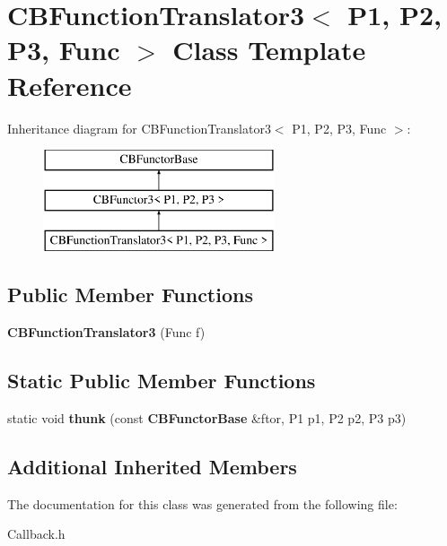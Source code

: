 \section{C\+B\+Function\+Translator3$<$ P1, P2, P3, Func $>$ Class Template Reference}
\label{classCBFunctionTranslator3}
Inheritance diagram for C\+B\+Function\+Translator3$<$ P1, P2, P3, Func $>$\+:\begin{figure}[H]
\begin{center}
\leavevmode
\includegraphics[height=3.000000cm]{classCBFunctionTranslator3}
\end{center}
\end{figure}
\subsection*{Public Member Functions}
\begin{DoxyCompactItemize}
\item 
{\bfseries C\+B\+Function\+Translator3} (Func f)\label{classCBFunctionTranslator3_a59d1209449916b44b8ff86c0101c2df8}

\end{DoxyCompactItemize}
\subsection*{Static Public Member Functions}
\begin{DoxyCompactItemize}
\item 
static void {\bfseries thunk} (const {\bf C\+B\+Functor\+Base} \&ftor, P1 p1, P2 p2, P3 p3)\label{classCBFunctionTranslator3_a5460798da25c1e51d51bdad9a8e79f57}

\end{DoxyCompactItemize}
\subsection*{Additional Inherited Members}


The documentation for this class was generated from the following file\+:\begin{DoxyCompactItemize}
\item 
Callback.\+h\end{DoxyCompactItemize}
